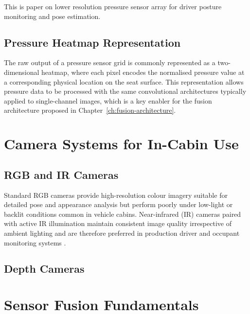 \cite{s21103346} This is paper on lower resolution pressure sensor array for driver posture monitoring and pose estimation.



\subsection{Pressure Heatmap Representation}
\label{sec:pressure-heatmap-representation}
The raw output of a pressure sensor grid is commonly represented as a
two-dimensional heatmap, where each pixel encodes the normalised pressure
value at a corresponding physical location on the seat surface. This
representation allows pressure data to be processed with the same
convolutional architectures typically applied to single-channel images,
which is a key enabler for the fusion architecture proposed in
Chapter~\ref{ch:fusion-architecture}.


\section{Camera Systems for In-Cabin Use}
\label{sec:camera-systems}

\subsection{RGB and IR Cameras}
\label{sec:rgb-ir-cameras}
Standard RGB cameras provide high-resolution colour imagery suitable for
detailed pose and appearance analysis but perform poorly under low-light
or backlit conditions common in vehicle cabins. Near-infrared (IR)
cameras paired with active IR illumination maintain consistent image
quality irrespective of ambient lighting and are therefore preferred in
production driver and occupant monitoring systems \cite{schmidt2020driver}.


\subsection{Depth Cameras }
\label{sec:depth-tof-cameras}


\section{Sensor Fusion Fundamentals}
\label{sec:sensor-fusion-fundamentals}

